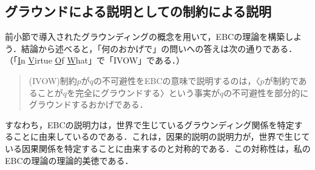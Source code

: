 \documentclass[dvipdfmx,twoside,11pt,uplatex]{jsarticle}
\theoremstyle{definition}
\begin{document}
\subsection{グラウンドによる説明としての制約による説明}
前小節で導入されたグラウンディングの概念を用いて，EBCの理論を構築しよう．結論から述べると，「何のおかげで」の問いへの答えは次の通りである．（「\underline{I}n \underline{V}irtue \underline{O}f \underline{W}hat」で「IVOW」である．）
\begin{quote}
    (IVOW)\quad 制約$p$が$q$の不可避性をEBCの意味で説明するのは，〈$p$が制約であることが$q$を完全にグラウンドする〉という事実が$q$の不可避性を部分的にグラウンドするおかげである．
\end{quote}
すなわち，EBCの説明力は，世界で生じているグラウンディング関係を特定することに由来しているのである．これは，因果的説明の説明力が，世界で生じている因果関係を特定することに由来するのと対称的である．この対称性は，私のEBCの理論の理論的美徳である．
\end{document}

